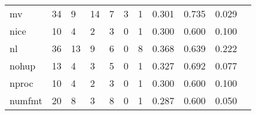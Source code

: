 \begin{longtable}{lp{1.2cm}p{1.2cm}p{1.2cm}p{1.2cm}p{1.2cm}p{1.2cm}p{1.2cm}p{1.2cm}p{1.2cm}p{1.2cm}}
mv        &                                    34 &                                                  9 &                                                 14 &                                                  7 &                                                  3 &                                                  1 &                                              0.301 &                                              0.735 &                                              0.029 \\
nice      &                                    10 &                                                  4 &                                                  2 &                                                  3 &                                                  0 &                                                  1 &                                              0.300 &                                              0.600 &                                              0.100 \\
nl        &                                    36 &                                                 13 &                                                  9 &                                                  6 &                                                  0 &                                                  8 &                                              0.368 &                                              0.639 &                                              0.222 \\
nohup     &                                    13 &                                                  4 &                                                  3 &                                                  5 &                                                  0 &                                                  1 &                                              0.327 &                                              0.692 &                                              0.077 \\
nproc     &                                    10 &                                                  4 &                                                  2 &                                                  3 &                                                  0 &                                                  1 &                                              0.300 &                                              0.600 &                                              0.100 \\
numfmt    &                                    20 &                                                  8 &                                                  3 &                                                  8 &                                                  0 &                                                  1 &                                              0.287 &                                              0.600 &                                              0.050 \\

\end{longtable}
